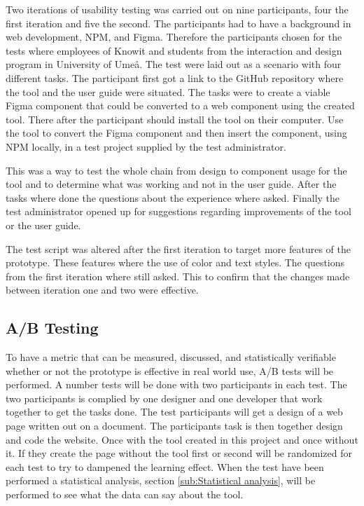 Two iterations of usability testing was carried out on nine participants, four the first iteration and five the second. The participants had to have a background in web development, NPM, and Figma.  Therefore the participants chosen for the tests where employees of Knowit and students from the interaction and design program in University of Umeå. The test were laid out as a scenario with four different tasks. The participant first got a link to the GitHub repository where the tool and the user guide were situated. The tasks were to create a viable Figma component that could be converted to a web component using the created tool. There after the participant should install the tool on their computer. Use the tool to convert the Figma component and then insert the component, using NPM locally, in a test project supplied by the test administrator.

This was a way to test the whole chain from design to component usage for the tool and to determine what was working and not in the user guide. After the tasks where done the questions about the experience where asked. Finally the test administrator opened up for suggestions regarding improvements of the tool or the user guide. 

The test script was altered after the first iteration to target more features of the prototype. These features where the use of color and text styles. The questions from the first iteration where still asked. This to confirm that the changes made between iteration one and two were effective. 


\subsection{ A/B Testing }%
\label{sub:ab-testing}

To have a metric that can be measured, discussed, and statistically verifiable whether or not the prototype is effective in real world use, A/B tests will be performed. A number tests will be done with two participants in each test. The two participants is complied by one designer and one developer that work together to get the tasks done. The test participants will get a design of a web page written out on a document. The participants task is then together design and code the website. Once with the tool created in this project and once without it. If they create the page without the tool first or second will be randomized for each test to try to dampened the learning effect. When the test have been performed a statistical analysis, section \ref{sub:Statistical analysis}, will be performed to see what the data can say about the tool.


